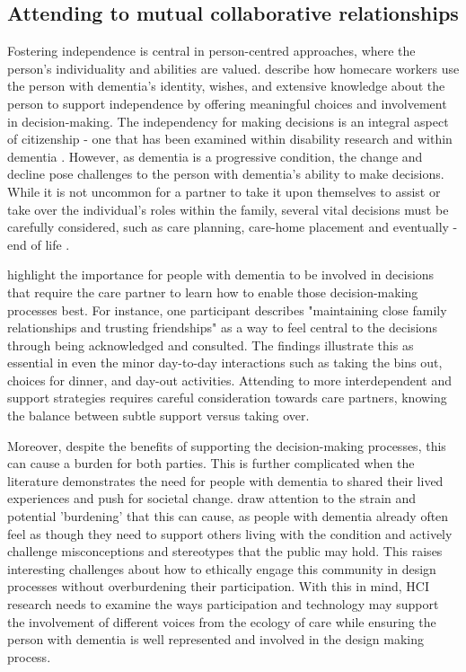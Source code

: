 \subsection{Attending to mutual collaborative relationships}
\label{BL:gap:relationships}
Fostering independence is central in person-centred approaches, where the person's individuality and abilities are valued. \cite{leverton2021supporting} describe how homecare workers use the person with dementia's identity, wishes, and extensive knowledge about the person to support independence by offering meaningful choices and involvement in decision-making. The independency for making decisions is an integral aspect of citizenship - one that has been examined within disability research and within dementia \citep{meissner_-it-yourself_2017,samsi_everyday_2013}. However, as dementia is a progressive condition, the change and decline pose challenges to the person with dementia's ability to make decisions. While it is not uncommon for a partner to take it upon themselves to assist or take over the individual's roles within the family, several vital decisions must be carefully considered, such as care planning, care-home placement and eventually - end of life \citep{fetherstonhaugh_decision-making_2017}.

\cite{fetherstonhaugh2013being} highlight the importance for people with dementia to be involved in decisions that require the care partner to learn how to enable those decision-making processes best. For instance, one participant describes "maintaining close family relationships and trusting friendships" as a way to feel central to the decisions through being acknowledged and consulted. The findings illustrate this as essential in even the minor day-to-day interactions such as taking the bins out, choices for dinner, and day-out activities. Attending to more interdependent and support strategies requires careful consideration towards care partners, knowing the balance between subtle support versus taking over.

Moreover, despite the benefits of supporting the decision-making processes, this can cause a burden for both parties. This is further complicated when the literature demonstrates the need for people with dementia to shared their lived experiences and push for societal change. \citep{johnson_older_2019} draw attention to the strain and potential 'burdening' that this can cause, as people with dementia already often feel as though they need to support others living with the condition and actively challenge misconceptions and stereotypes that the public may hold. This raises interesting challenges about how to ethically engage this community in design processes without overburdening their participation. With this in mind, HCI research needs to examine the ways participation and technology may support the involvement of different voices from the ecology of care while ensuring the person with dementia is well represented and involved in the design making process. 


